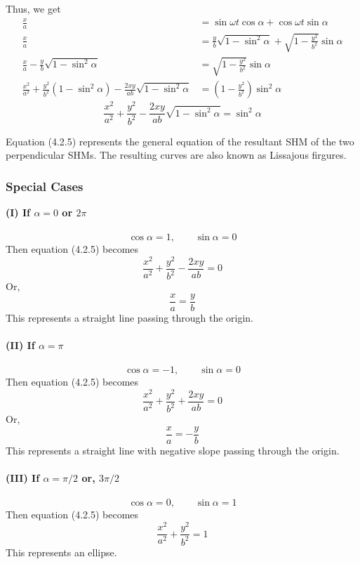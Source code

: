 \documentclass[12pt]{article}
\numberwithin{equation}{subsection}
\begin{document}
Thus, we get
\begin{align*}
    \frac{x}{a} &= \sin{\omega t}\cos{\alpha} + \cos{\omega t}\sin{\alpha} \\
    \frac{x}{a} &= \frac{y}{b} \sqrt{1 - \sin^2{\alpha}} + \sqrt{1 - \frac{y^2}{b^2}} \sin{\alpha} \\
    \frac{x}{a} - \frac{y}{b} \sqrt{1 - \sin^2{\alpha}} &= \sqrt{1 - \frac{y^2}{b^2}} \sin{\alpha} \\
    \frac{x^2}{a^2} + \frac{y^2}{b^2} (1 - \sin^2{\alpha}) - \frac{2xy}{ab} \sqrt{1 - \sin^2{\alpha}} &= \left( 1 - \frac{y^2}{b^2} \right) \sin^2{\alpha}
\end{align*}
\begin{equation}
    \boxed{ \frac{x^2}{a^2} + \frac{y^2}{b^2} - \frac{2xy}{ab} \sqrt{1 - \sin^2{\alpha}} = \sin^2{\alpha} }
\end{equation}

Equation (4.2.5) represents the general equation of the resultant SHM of the two perpendicular SHMs. The resulting curves are also known as Lissajous firgures.

\subsubsection{Special Cases}
\textbf{(I) If $\alpha=0$ or $2\pi$}\\~\\
\[ \cos{\alpha} = 1, \qquad \sin{\alpha} = 0 \]
Then equation (4.2.5) becomes \[
    \frac{x^2}{a^2} + \frac{y^2}{b^2} - \frac{2xy}{ab} = 0
\]
Or, \[
    \frac{x}{a} = \frac{y}{b}
\]
This represents a straight line passing through the origin.\\~\\


\textbf{(II) If $\alpha=\pi$}\\~\\
\[ \cos{\alpha} = -1, \qquad \sin{\alpha} = 0 \]
Then equation (4.2.5) becomes \[
    \frac{x^2}{a^2} + \frac{y^2}{b^2} + \frac{2xy}{ab} = 0
\]
Or, \[
    \frac{x}{a} = -\frac{y}{b}
\]
This represents a straight line with negative slope passing through the origin.\\~\\


\textbf{(III) If $\alpha=\pi/2$ or, $3\pi/2$}\\~\\
\[ \cos{\alpha} = 0, \qquad \sin{\alpha} = 1 \]
Then equation (4.2.5) becomes \[
    \frac{x^2}{a^2} + \frac{y^2}{b^2} = 1
\]
This represents an ellipse.\\~\\
\end{document}
